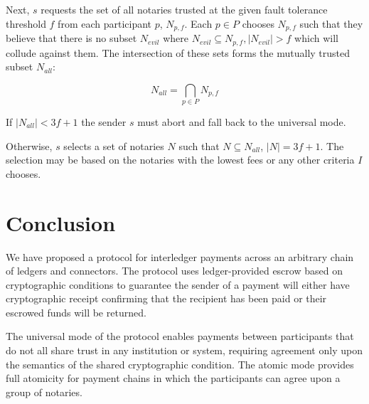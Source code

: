 \documentclass[letterpaper,twocolumn,10pt]{article}
\begin{document}
Next, $s$ requests the set of all notaries trusted at the given fault tolerance threshold $f$ from each participant $p$, $N_{p,f}$. Each $p \in P$ chooses $N_{p,f}$ such that they believe that there is no subset $N_{evil}$ where $N_{evil} \subseteq N_{p,f}, |N_{evil}| > f$ which will collude against them. The intersection of these sets forms the mutually trusted subset $N_{all}$:

\begin{equation}
N_{all} = \bigcap_{p \in P} N_{p,f}
\end{equation}

If $|N_{all}| < 3f+1$ the sender $s$ must abort and fall back to the universal mode.

Otherwise, $s$ selects a set of notaries $N$ such that $N \subseteq N_{all}$, $|N| = 3f + 1$. The selection may be based on the notaries with the lowest fees or any other criteria $I$ chooses.




% 

\section{Conclusion}


We have proposed a protocol for interledger payments across an arbitrary chain of ledgers and connectors. The protocol uses ledger-provided escrow based on cryptographic conditions to guarantee the sender of a payment will either have cryptographic receipt confirming that the recipient has been paid or their escrowed funds will be returned.

The universal mode of the protocol enables payments between participants that do not all share trust in any institution or system, requiring agreement only upon the semantics of the shared cryptographic condition. The atomic mode provides full atomicity for payment chains in which the participants can agree upon a group of notaries.
\end{document}
